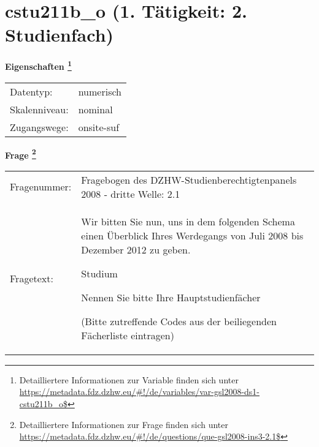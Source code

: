 
    \setcounter{footnote}{0}

    \vspace*{-1.8cm}
	\section{cstu211b\_o (1. Tätigkeit: 2. Studienfach)}
	\label{section:cstu211b_o}



    \vspace*{0.5cm}
    \noindent\textbf{Eigenschaften
	\footnote{Detailliertere Informationen zur Variable finden sich unter
		\url{https://metadata.fdz.dzhw.eu/\#!/de/variables/var-gsl2008-ds1-cstu211b_o$}}}\\
	\begin{tabularx}{\hsize}{@{}lX}
	Datentyp: & numerisch \\
	Skalenniveau: & nominal \\
	Zugangswege: &
	  onsite-suf
 \\
    \end{tabularx}



				\vspace*{0.5cm}
                \noindent\textbf{Frage
	                \footnote{Detailliertere Informationen zur Frage finden sich unter
		              \url{https://metadata.fdz.dzhw.eu/\#!/de/questions/que-gsl2008-ins3-2.1$}}}\\
				\begin{tabularx}{\hsize}{@{}lX}
					Fragenummer: &
					  Fragebogen des DZHW-Studienberechtigtenpanels 2008 - dritte Welle:
					  2.1
 \\
					Fragetext: & Wir bitten Sie nun, uns in dem folgenden Schema einen Überblick Ihres Werdegangs von Juli 2008 bis Dezember 2012 zu geben.\par  Studium\par  Nennen Sie bitte Ihre Hauptstudienfächer\par  (Bitte zutreffende Codes aus der beiliegenden Fächerliste eintragen) \\
				\end{tabularx}






